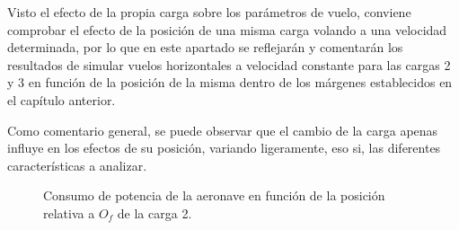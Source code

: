 Visto el efecto de la propia carga sobre los parámetros de vuelo, conviene comprobar el efecto de la posición de una misma carga volando a una velocidad determinada, por lo que en este apartado se reflejarán y comentarán los resultados de simular vuelos horizontales a velocidad constante para las cargas 2 y 3 en función de la posición de la misma dentro de los márgenes establecidos en el capítulo anterior.

Como comentario general, se puede observar que el cambio de la carga apenas influye en los efectos de su posición, variando ligeramente, eso si, las diferentes características a analizar.

\begin{figure}
	\centering
	\caption{Consumo de potencia de la aeronave en función de la posición relativa a $O_f$ de la carga 2.}
	\label{PMVH2lxy}
\end{figure}
